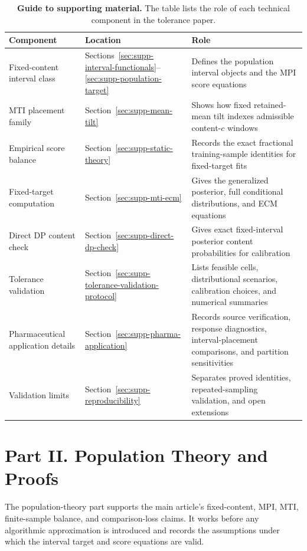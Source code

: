 \documentclass[11pt]{article}
\newcommand{\TableStyle}{\footnotesize\setlength{\tabcolsep}{4pt}\renewcommand{\arraystretch}{1.08}}
\newcounter{algorithm}
\begin{document}
\begin{table}[H]
\centering
\caption{\textbf{Guide to supporting material.} The table lists the role of
each technical component in the tolerance paper.}
\label{tab:supp-support-map}
\TableStyle
\begin{tabularx}{\textwidth}{@{}>{\raggedright\arraybackslash}p{}
  >{\raggedright\arraybackslash}p{}
  >{\raggedright\arraybackslash}X@{}}
\toprule
Component & Location & Role\\
\midrule
Fixed-content interval class
& Sections~\ref{sec:supp-interval-functionals}--\ref{sec:supp-population-target}
& Defines the population interval objects and the MPI score equations\\
MTI placement family
& Section~\ref{sec:supp-mean-tilt}
& Shows how fixed retained-mean tilt indexes admissible content-\(c\) windows\\
Empirical score balance
& Section~\ref{sec:supp-static-theory}
& Records the exact fractional training-sample identities for fixed-target fits\\
Fixed-target computation
& Section~\ref{sec:supp-mti-ecm}
& Gives the generalized posterior, full conditional distributions, and ECM equations\\
Direct DP content check
& Section~\ref{sec:supp-direct-dp-check}
& Gives exact fixed-interval posterior content probabilities for calibration\\
Tolerance validation
& Section~\ref{sec:supp-tolerance-validation-protocol}
& Lists feasible cells, distributional scenarios, calibration choices, and numerical summaries\\
Pharmaceutical application details
& Section~\ref{sec:supp-pharma-application}
& Records source verification, response diagnostics, interval-placement comparisons, and partition sensitivities\\
Validation limits
& Section~\ref{sec:supp-reproducibility}
& Separates proved identities, repeated-sampling validation, and open extensions\\
\bottomrule
\end{tabularx}
\end{table}

\section*{Part II. Population Theory and Proofs}

The population-theory part supports the main article's fixed-content, MPI, MTI,
finite-sample balance, and comparison-loss claims. It works before any
algorithmic approximation is introduced and records the assumptions under which
the interval target and score equations are valid.
\end{document}
